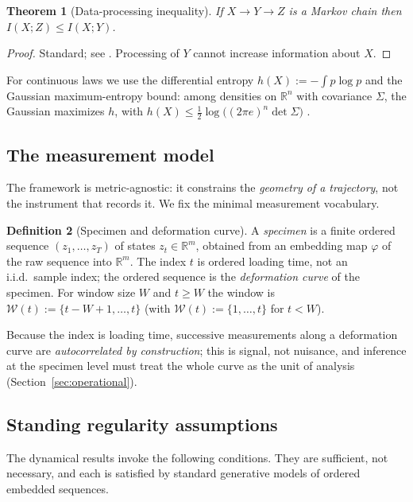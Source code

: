 \documentclass[11pt]{article}
\theoremstyle{plain}
\newtheorem{theorem}{Theorem}[section]
\theoremstyle{definition}
\newtheorem{definition}[theorem]{Definition}
\theoremstyle{remark}
\newcommand{\R}{\mathbb{R}}
\begin{document}
\begin{theorem}[Data-processing inequality]\label{thm:dpi}
If $X\to Y\to Z$ is a Markov chain then $I(X;Z)\le I(X;Y)$.
\end{theorem}
\begin{proof}
Standard; see \citep[Thm.~2.8.1]{coverthomas2006}. Processing of $Y$ cannot increase information about $X$.
\end{proof}

For continuous laws we use the differential entropy $h(X):=-\int p\log p$ and the Gaussian maximum-entropy bound: among densities on $\R^n$ with covariance $\Sigma$, the Gaussian maximizes $h$, with $h(X)\le\tfrac12\log\!\big((2\pi e)^n\det\Sigma\big)$ \citep[Thm.~8.6.5]{coverthomas2006}.

\subsection{The measurement model}

The framework is metric-agnostic: it constrains the \emph{geometry of a trajectory}, not the instrument that records it. We fix the minimal measurement vocabulary.

\begin{definition}[Specimen and deformation curve]
A \emph{specimen} is a finite ordered sequence $(z_1,\dots,z_T)$ of states $z_t\in\R^{m}$, obtained from an embedding map $\varphi$ of the raw sequence into $\R^m$. The index $t$ is ordered loading time, not an i.i.d.\ sample index; the ordered sequence is the \emph{deformation curve} of the specimen. For window size $W$ and $t\ge W$ the window is $\mathcal{W}(t):=\{t-W+1,\dots,t\}$ (with $\mathcal{W}(t):=\{1,\dots,t\}$ for $t<W$).
\end{definition}

Because the index is loading time, successive measurements along a deformation curve are \emph{autocorrelated by construction}; this is signal, not nuisance, and inference at the specimen level must treat the whole curve as the unit of analysis (Section~\ref{sec:operational}).

\subsection{Standing regularity assumptions}

The dynamical results invoke the following conditions. They are sufficient, not necessary, and each is satisfied by standard generative models of ordered embedded sequences.
\end{document}
